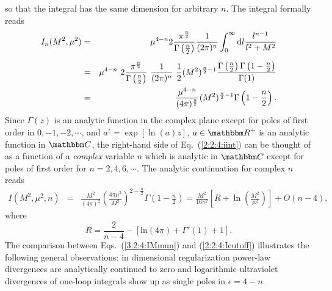 \documentclass[twoside,12pt]{article}
\begin{document}
so that the integral has the same dimension for arbitrary $n$.
   The integral formally reads
\begin{eqnarray}
\label{2:2:4:iint}
I_n(M^2,\mu^2)&=& \mu^{4-n}2\frac{\pi^{\frac{n}{2}}}{\Gamma\left(
\frac{n}{2}\right)} \frac{1}{(2\pi)^n}
\int_0^\infty {\rm d}l
\frac{l^{n-1}}{l^2+M^2}\nonumber\\[0.5em]
&=&\mu^{4-n}\,\,2\frac{\pi^{\frac{n}{2}}}{\Gamma\left( \frac{n}{2}\right)}\,\,
\frac{1}{(2\pi)^n}\,\, \frac{1}{2} (M^2)^{\frac{n}{2}-1}\frac{\Gamma
\left(\frac{n}{2}\right)\Gamma\left(1-\frac{n}{2}\right)}{
\Gamma(1)}\nonumber\\
&=&\frac{\mu^{4-n}}{(4\pi)^{\frac{n}{2}}} (M^2)^{\frac{n}{2}-1}
\Gamma\left(1-\frac{n}{2}\right).
\end{eqnarray}
      Since $\Gamma(z)$ is an analytic function in the complex plane except
for poles of first order in $0,-1,-2,\cdots$, and
$a^z=\exp[\ln(a)z]$, $a\in {\mathbbm R}^+$ is an analytic function in $\mathbbm C$,
the right-hand side of Eq.\ (\ref{2:2:4:iint}) can be thought of
as a function of a {\em complex} variable $n$ which is
analytic in $\mathbbm C$ except for poles of first order
for $n=2,4,6,\cdots$.
   The analytic continuation for complex $n$ reads
\begin{eqnarray}
\label{3:2:4:IMmun}
I(M^2,\mu^2,n)&=&
\frac{M^2}{(4\pi)^2}\left(\frac{4\pi\mu^2}{M^2}\right)^{2-\frac{n}{2}}
\Gamma\left(1-\frac{n}{2}\right)
=\frac{M^2}{16\pi^2}\left[
R+\ln\left(\frac{M^2}{\mu^2}\right)\right]+O(n-4),
\end{eqnarray}
where
\begin{equation}
\label{3:2:5:R}
R=\frac{2}{n-4}
-[\mbox{ln}(4\pi)+\Gamma'(1)+1].
\end{equation}
   The comparison between Eqs.~(\ref{3:2:4:IMmun}) and (\ref{2:2:4:Icutoff})
illustrates the following general observations:
   in dimensional regularization power-law divergences are
analytically continued to zero and
   logarithmic ultraviolet divergences of one-loop integrals show up as
single poles in $\epsilon=4-n$.
\end{document}
